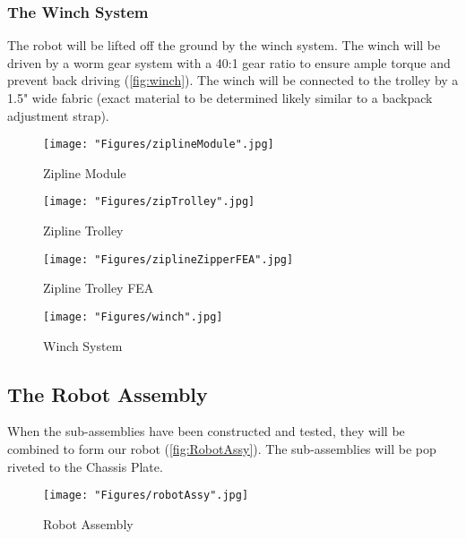 \documentclass[11pt, oneside]{article} %
\begin{document}
		\subsubsection{The Winch System}
		The robot will be lifted off the ground by the winch system. The winch will be driven by a worm gear system with a 40:1 gear ratio to ensure ample torque and prevent back driving (\autoref{fig:winch}). The winch will be connected to the trolley by a 1.5" wide fabric (exact material to be determined likely similar to a backpack adjustment strap). 
		
		\begin{figure}[h]
			\centering
			\begin{minipage}[t]{.5\textwidth}
				\centering
				\texttt{[image: "Figures/ziplineModule".jpg]}
				\caption[Zipline Module]{Zipline Module}
				\label{fig:zipModule}
			\end{minipage}%
			\begin{minipage}[t]{.5\textwidth}
				\centering
				\texttt{[image: "Figures/zipTrolley".jpg]}
				\caption[Zipline Trolley]{Zipline Trolley}
				\label{fig:zipTrolley}
			\end{minipage}
		\end{figure}	
		
		\begin{figure}[h]
			\centering
			\begin{minipage}[t]{.5\textwidth}
				\centering
				\texttt{[image: "Figures/ziplineZipperFEA".jpg]}
				\caption[Zipline Trolley FEA]{Zipline Trolley FEA}
				\label{fig:zipFEA}
			\end{minipage}%
			\begin{minipage}[t]{.5\textwidth}
				\centering
				\texttt{[image: "Figures/winch".jpg]}
				\caption[WinchSystem]{Winch System}
				\label{fig:winch}
			\end{minipage}
		\end{figure}
	
	\newpage
	\subsection{The Robot Assembly}
	When the sub-assemblies have been constructed and tested, they will be combined to form our robot (\autoref{fig:RobotAssy}). The sub-assemblies will be pop riveted to the Chassis Plate.
	
	\begin{figure}[h]
		\centering
		\texttt{[image: "Figures/robotAssy".jpg]}
		\caption[Robot Assembly]{Robot Assembly}
		\label{fig:RobotAssy}
	\end{figure}
	
\end{document}
